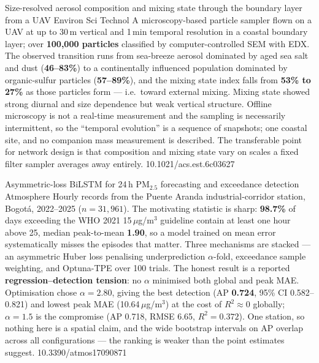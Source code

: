 \documentclass[10pt]{article}
\begin{document}
{Size-resolved aerosol composition and mixing state through the boundary layer from a UAV}
{Environ Sci Technol}
{A microscopy-based particle sampler flown on a UAV at up to 30\,m vertical and 1\,min
temporal resolution in a coastal boundary layer; over \textbf{100{,}000 particles} classified
by computer-controlled SEM with EDX. The observed transition runs from sea-breeze aerosol
dominated by aged sea salt and dust (\textbf{46--83\%}) to a continentally influenced
population dominated by organic-sulfur particles (\textbf{57--89\%}), and the mixing state
index falls from \textbf{53\% to 27\%} as those particles form --- i.e.\ toward external
mixing. Mixing state showed strong diurnal and size dependence but weak vertical structure.
Offline microscopy is not a real-time measurement and the sampling is necessarily
intermittent, so the ``temporal evolution'' is a sequence of snapshots; one coastal site, and
no companion mass measurement is described. The transferable point for network design is that
composition and mixing state vary on scales a fixed filter sampler averages away entirely.}
{10.1021/acs.est.6c03627}

{Asymmetric-loss BiLSTM for 24\,h PM$_{2.5}$ forecasting and exceedance detection}
{Atmosphere}
{Hourly records from the Puente Aranda industrial-corridor station, Bogot\'a, 2022--2025
($n=31{,}961$). The motivating statistic is sharp: \textbf{98.7\%} of days exceeding the WHO
2021 15\,$\mu$g/m$^3$ guideline contain at least one hour above 25, median peak-to-mean
\textbf{1.90}, so a model trained on mean error systematically misses the episodes that
matter. Three mechanisms are stacked --- an asymmetric Huber loss penalising underprediction
$\alpha$-fold, exceedance sample weighting, and Optuna-TPE over 100 trials. The honest result
is a reported \textbf{regression--detection tension}: no $\alpha$ minimised both global and
peak MAE. Optimisation chose $\alpha=2.80$, giving the best detection (AP \textbf{0.724},
95\% CI 0.582--0.821) and lowest peak MAE (10.64\,$\mu$g/m$^3$) at the cost of
\textbf{$R^2\approx0$} globally; $\alpha=1.5$ is the compromise (AP 0.718, RMSE 6.65,
$R^2=0.372$). One station, so nothing here is a spatial claim, and the wide bootstrap
intervals on AP overlap across all configurations --- the ranking is weaker than the point
estimates suggest.}
{10.3390/atmos17090871}
\end{document}
